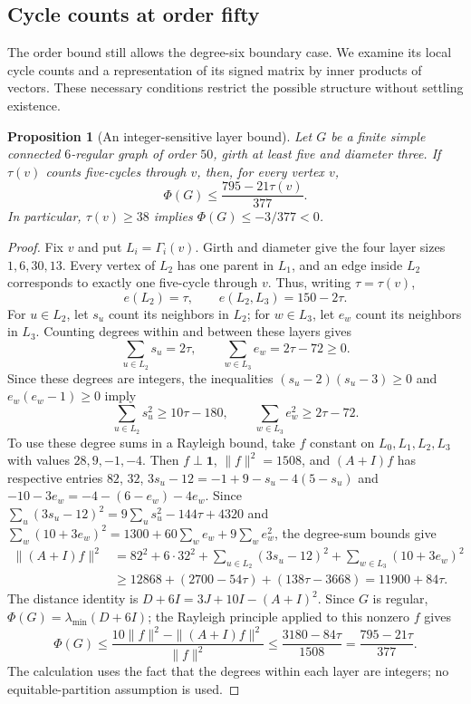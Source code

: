 \documentclass[a4paper,10pt,reqno]{amsart}
\theoremstyle{plain}
\newtheorem{proposition}[theorem]{Proposition}
\theoremstyle{definition}
\theoremstyle{remark}
\newcommand{\one}{\mathbf 1}
\begin{document}
\subsection{Cycle counts at order fifty}

The order bound still allows the degree-six boundary case. We examine its
local cycle counts and a representation of its signed matrix by inner
products of vectors. These necessary conditions restrict the possible
structure without settling existence.


\begin{proposition}[An integer-sensitive layer bound]\label{prop:order50-layer-vector}
Let $G$ be a finite simple connected $6$-regular graph of order $50$,
girth at least five and diameter three. If $\tau(v)$ counts five-cycles
through $v$, then, for every vertex $v$,
\[
 \Phi(G)\le\frac{795-21\tau(v)}{377}.
\]
In particular, $\tau(v)\ge38$ implies $\Phi(G)\le-3/377<0$.
\end{proposition}
\begin{proof}
Fix $v$ and put $L_i=\Gamma_i(v)$. Girth and diameter give the four layer
sizes $1,6,30,13$.
Every vertex of $L_2$ has one parent in $L_1$, and an edge inside $L_2$
corresponds to exactly one five-cycle through $v$. Thus, writing
$\tau=\tau(v)$,
\[
 e(L_2)=\tau,\qquad e(L_2,L_3)=150-2\tau.
\]
For $u\in L_2$, let $s_u$ count its neighbors in $L_2$; for $w\in L_3$,
let $e_w$ count its neighbors in $L_3$. Counting degrees within and between
these layers gives
\[
 \sum_{u\in L_2}s_u=2\tau,\qquad
 \sum_{w\in L_3}e_w=2\tau-72\ge0.
\]
Since these degrees are integers, the inequalities
$(s_u-2)(s_u-3)\ge0$ and $e_w(e_w-1)\ge0$ imply
\[
 \sum_{u\in L_2}s_u^2\ge10\tau-180,\qquad
 \sum_{w\in L_3}e_w^2\ge2\tau-72.
\]
To use these degree sums in a Rayleigh bound, take $f$ constant on
$L_0,L_1,L_2,L_3$ with values $28,9,-1,-4$.
Then $f\perp\one$, $\|f\|^2=1508$, and $(A+I)f$ has respective entries
$82$, $32$, $3s_u-12=-1+9-s_u-4(5-s_u)$ and $-10-3e_w=-4-(6-e_w)-4e_w$.
Since $\sum_u(3s_u-12)^2=9\sum_us_u^2-144\tau+4320$ and
$\sum_w(10+3e_w)^2=1300+60\sum_we_w+9\sum_we_w^2$, the degree-sum bounds
give
\[
 \begin{aligned}
 \|(A+I)f\|^2
 &=82^2+6\cdot32^2+\sum_{u\in L_2}(3s_u-12)^2
                       +\sum_{w\in L_3}(10+3e_w)^2\\
 &\ge12868+(2700-54\tau)+(138\tau-3668)
 =11900+84\tau.
 \end{aligned}
\]
The distance identity is $D+6I=3J+10I-(A+I)^2$.
Since $G$ is regular, $\Phi(G)=\lambda_{\min}(D+6I)$; the Rayleigh
principle applied to this nonzero $f$ gives
\[
 \Phi(G)\le\frac{10\|f\|^2-\|(A+I)f\|^2}{\|f\|^2}
 \le\frac{3180-84\tau}{1508}=\frac{795-21\tau}{377}.
\]
The calculation uses the fact that the degrees within each layer are integers; no
equitable-partition assumption is used.
\end{proof}
\end{document}
